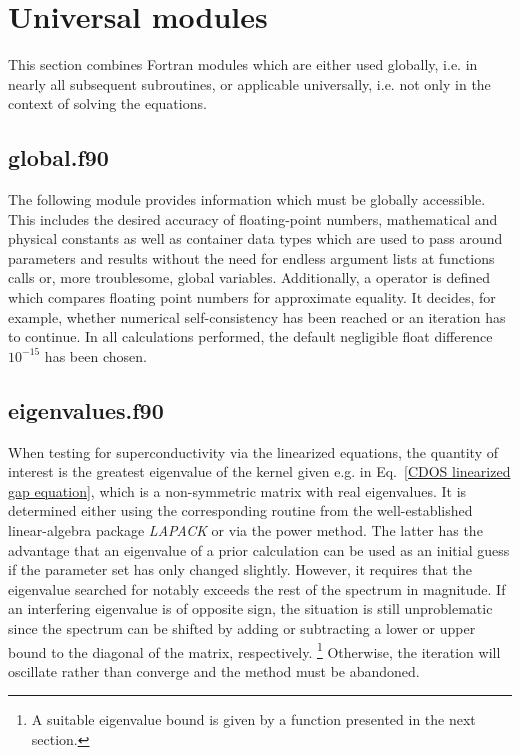 \section{Universal modules}

This section combines Fortran modules which are either used globally, i.e. in
nearly all subsequent subroutines, or applicable universally, i.e. not only in
the context of solving the  equations.

\subsection{global.f90}

The following module provides information which must be globally accessible.
This includes the desired accuracy of floating-point numbers, mathematical and
physical constants as well as container data types which are used to pass around
parameters and results without the need for endless argument lists at functions
calls or, more troublesome, global variables. Additionally, a operator is
defined which compares floating point numbers for approximate equality. It
decides, for example, whether numerical self-consistency has been reached or an
iteration has to continue. In all calculations performed, the default negligible
float difference $10^{-15}$ has been chosen.



\subsection{eigenvalues.f90}

When testing for superconductivity via the linearized 
equations, the quantity of interest is the greatest eigenvalue of the kernel
given e.g. in Eq.~\ref{CDOS linearized gap equation}, which is a non-symmetric
matrix with real eigenvalues. It is determined either using the corresponding
routine from the well-established linear-algebra package \emph{LAPACK}
\cite{LAPACK99} or via the power method. The latter has the advantage that an
eigenvalue of a prior calculation can be used as an initial guess if the
parameter set has only changed slightly. However, it requires that the
eigenvalue searched for notably exceeds the rest of the spectrum in magnitude.
If an interfering eigenvalue is of opposite sign, the situation is still
unproblematic since the spectrum can be shifted by adding or subtracting a lower
or upper bound to the diagonal of the matrix, respectively.%
%
\footnote{A suitable eigenvalue bound is given by a function presented in the
next section.}
%
Otherwise, the iteration will oscillate rather than converge and the method must
be abandoned.

